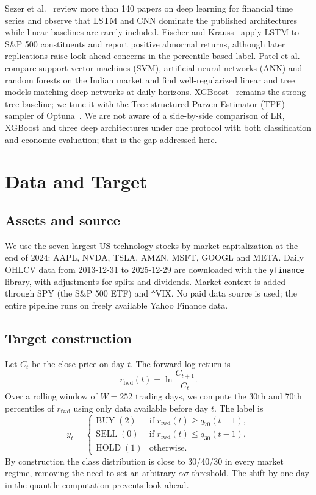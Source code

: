 \documentclass[runningheads]{llncs}
\begin{document}
Sezer et al.~\cite{sezer2020} review more than 140 papers on deep learning for financial time series and observe that LSTM and CNN dominate the published architectures while linear baselines are rarely included. Fischer and Krauss~\cite{fischer2018} apply LSTM to S\&P 500 constituents and report positive abnormal returns, although later replications raise look-ahead concerns in the percentile-based label. Patel et al.~\cite{patel2015} compare support vector machines (SVM), artificial neural networks (ANN) and random forests on the Indian market and find well-regularized linear and tree models matching deep networks at daily horizons. XGBoost~\cite{chen2016} remains the strong tree baseline; we tune it with the Tree-structured Parzen Estimator (TPE) sampler of Optuna~\cite{akiba2019}. We are not aware of a side-by-side comparison of LR, XGBoost and three deep architectures under one protocol with both classification and economic evaluation; that is the gap addressed here.

\section{Data and Target}
\label{sec:data}

\subsection{Assets and source}

We use the seven largest US technology stocks by market capitalization at the end of 2024: AAPL, NVDA, TSLA, AMZN, MSFT, GOOGL and META. Daily OHLCV data from 2013-12-31 to 2025-12-29 are downloaded with the \texttt{yfinance} library, with adjustments for splits and dividends. Market context is added through SPY (the S\&P 500 ETF) and \verb|^|VIX. No paid data source is used; the entire pipeline runs on freely available Yahoo Finance data.

\subsection{Target construction}

Let $C_t$ be the close price on day $t$. The forward log-return is
\begin{equation}
r_{\text{fwd}}(t) = \ln\frac{C_{t+1}}{C_t}.
\end{equation}
Over a rolling window of $W = 252$ trading days, we compute the 30th and 70th percentiles of $r_{\text{fwd}}$ using only data available before day $t$. The label is
\begin{equation}
y_t = \begin{cases}
\mathrm{BUY}\;(2) & \text{if } r_{\text{fwd}}(t) \ge q_{70}(t-1),\\
\mathrm{SELL}\;(0) & \text{if } r_{\text{fwd}}(t) \le q_{30}(t-1),\\
\mathrm{HOLD}\;(1) & \text{otherwise.}
\end{cases}
\end{equation}
By construction the class distribution is close to 30/40/30 in every market regime, removing the need to set an arbitrary $\alpha\sigma$ threshold. The shift by one day in the quantile computation prevents look-ahead.
\end{document}
